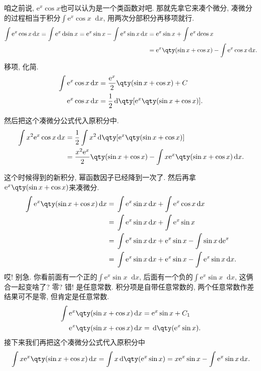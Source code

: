 \documentclass{ctexbook}
\newcommand{\e}{\mathrm{e}}
\newcommand*{\dif}{\mathop{}\!\mathrm{d}}
\begin{document}
{咱之前说, $\e^{x}\cos{x}$也可以认为是一个\uppercase\expandafter{}类函数对吧. 那就先拿它来凑个微分, 凑微分的过程相当于积分$\int\e^{x}\cos{x}\dif{x}$, 用两次分部积分再移项就行. 
\begin{align*}
\int\e^{x}\cos{x}\dif{x}=\int\e^{x}\dif{\sin{x}}=\e^{x}\sin{x}-\int\e^{x}\sin{x}\dif{x}={}&\e^{x}\sin{x}+\int\e^{x}\dif{\cos{x}}\\
={}&\e^{x}\qty(\sin{x}+\cos{x})-\int\e^{x}\cos{x}\dif{x}
.\end{align*}
移项, 化简. 
\begin{align*}
\int\e^{x}\cos{x}\dif{x}={}&\frac{\e^{x}}{2}\qty(\sin{x}+\cos{x})+C\\
\e^{x}\cos{x}\dif{x}={}&\frac{1}{2}\dif{\qty[\e^{x}\qty(\sin{x}+\cos{x})]}
.\end{align*}\par
然后把这个凑微分公式代入原积分中. 
\begin{align*}
\int x^{2}\e^{x}\cos{x}\dif{x}={}&\frac{1}{2}\int x^{2}\dif{\qty[\e^{x}\qty(\sin{x}+\cos{x})]}\\
={}&\frac{x^{2}\e^{x}}{2}\qty(\sin{x}+\cos{x})-\int x\e^{x}\qty(\sin{x}+\cos{x})\dif{x}
.\end{align*}\par
这个时候得到的新积分, 幂函数因子已经降到一次了. 然后再拿$\e^{x}\qty(\sin{x}+\cos{x})$来凑微分. 
\begin{align*}
\int\e^{x}\qty(\sin{x}+\cos{x})\dif{x}={}&\int\e^{x}\sin{x}\dif{x}+\int\e^{x}\cos{x}\dif{x}\\
={}&\int\e^{x}\sin{x}\dif{x}+\int\e^{x}\sin{x}\\
={}&\int\e^{x}\sin{x}\dif{x}+\e^{x}\sin{x}-\int\sin{x}\dif{\e^{x}}\\
={}&\int\e^{x}\sin{x}\dif{x}+\e^{x}\sin{x}-\int\e^{x}\sin{x}\dif{x}
.\end{align*}
哎! 别急. 你看前面有一个正的$\int\e^{x}\sin{x}\dif{x}$, 后面有一个负的$\int\e^{x}\sin{x}\dif{x}$, 这俩合一起变啥了? 零? 错! 是任意常数. 积分项是自带任意常数的, 两个任意常数作差结果可不是零, 但肯定是任意常数. 
\begin{align*}
\int\e^{x}\qty(\sin{x}+\cos{x})\dif{x}={}&\e^{x}\sin{x}+C_{1}\\
\e^{x}\qty(\sin{x}+\cos{x})\dif{x}={}&\dif{\qty(\e^{x}\sin{x})}
.\end{align*}
接下来我们再把这个凑微分公式代入原积分中
\begin{align*}
\int x\e^{x}\qty(\sin{x}+\cos{x})\dif{x}=\int x\dif{\qty(\e^{x}\sin{x})}=x\e^{x}\sin{x}-\int\e^{x}\sin{x}\dif{x}
.\end{align*}
}
\end{document}
